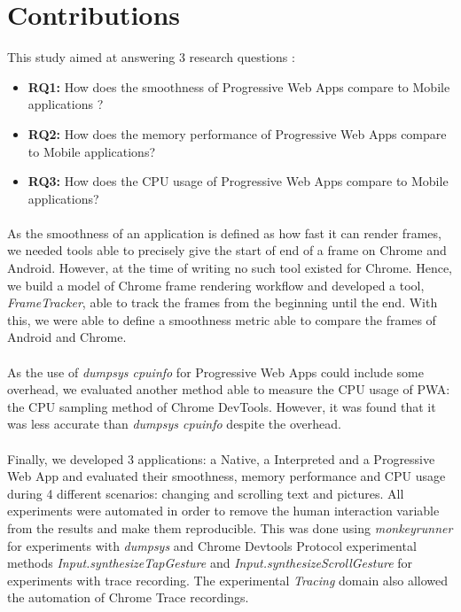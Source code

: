 \documentclass{kththesis}
\begin{document}
\section{Contributions}

This study aimed at answering 3 research questions : 
\begin{itemize}
    \item \textbf{RQ1:} How does the smoothness of Progressive Web Apps compare to Mobile applications ? 
    
    \item \textbf{RQ2:} How does the memory performance of Progressive Web Apps compare to Mobile applications? 
    \item \textbf{RQ3:} How does the CPU usage of Progressive Web Apps compare to Mobile applications?
\end{itemize}


\paragraph{}
As the smoothness of an application is defined as how fast it can render frames, we needed tools able to precisely give the start of end of a frame on Chrome and Android. However, at the time of writing no such tool existed for Chrome. Hence, we build a model of Chrome frame rendering workflow and developed a tool, \textit{FrameTracker}, able to track the frames from the beginning until the end. With this, we were able to define a smoothness metric able to compare the frames of Android and Chrome.

\paragraph{}
As the use of \textit{dumpsys cpuinfo} for Progressive Web Apps could include some overhead, we evaluated another method able to measure the CPU usage of PWA: the CPU sampling method of Chrome DevTools. However, it was found that it was less accurate than \textit{dumpsys cpuinfo} despite the overhead.

\paragraph{}
Finally, we developed 3 applications: a Native, a Interpreted and a Progressive Web App and evaluated their smoothness, memory performance and CPU usage during 4 different scenarios: changing and scrolling text and pictures. \newline
All experiments were automated in order to remove the human interaction variable from the results and make them reproducible. This was done using \textit{monkeyrunner} for experiments with \textit{dumpsys} and Chrome Devtools Protocol experimental methods \textit{Input.synthesizeTapGesture} and \textit{Input.synthesizeScrollGesture} for experiments with trace recording. The experimental \textit{Tracing} domain also allowed the automation of Chrome Trace recordings.
\end{document}
